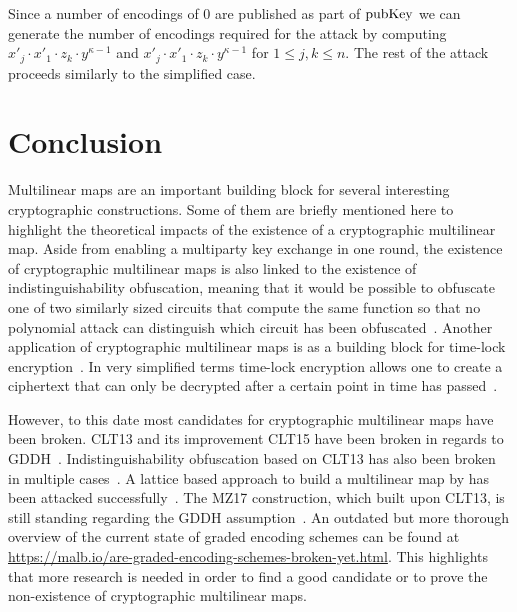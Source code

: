 \documentclass[english]{scrartcl}
\theoremstyle{plain}
\theoremstyle{definition}
\begin{document}
    Since a number of encodings of 0 are published as part of $\mathrm{pubKey}$ we can generate the number of encodings required for the attack by computing $x'_j \cdot x'_1 \cdot z_k \cdot y^{\kappa - 1}$ and $x'_j \cdot x'_1 \cdot z_k \cdot y^{\kappa - 1}$ for $1 \leq j, k \leq n$.
    The rest of the attack proceeds similarly to the simplified case.

    \section{Conclusion}
    Multilinear maps are an important building block for several interesting cryptographic constructions. Some of them are briefly mentioned here to highlight the theoretical impacts of the existence of a cryptographic multilinear map.
    Aside from enabling a multiparty key exchange in one round, the existence of cryptographic multilinear maps is also linked to the existence of indistinguishability obfuscation, meaning that it would be possible to obfuscate one of two similarly sized circuits that compute the same function so that no polynomial attack can distinguish which circuit has been obfuscated~\cite{albrecht2020multilinear}.
    Another application of cryptographic multilinear maps is as a building block for time-lock encryption~\cite{liu2018build}. In very simplified terms time-lock encryption allows one to create a ciphertext that can only be decrypted after a certain point in time has passed~\cite{liu2018build}.

    However, to this date most candidates for cryptographic multilinear maps have been broken. CLT13 and its improvement CLT15 have been broken in regards to GDDH~\cite{cryptoeprint:2014:906,cryptoeprint:2016:135}. Indistinguishability obfuscation based on CLT13 has also been broken in multiple cases~\cite{cryptoeprint:2019:1254,cryptoeprint:2019:309}.
    A lattice based approach to build a multilinear map by \citeauthor*{cryptoeprint:mm_gentry} has been attacked successfully~\cite*{cryptoeprint:ggh_attack}.
    The MZ17 construction, which built upon CLT13, is still standing regarding the GDDH assumption~\cite{cryptoeprint:2017:946}.
    An outdated but more thorough overview of the current state of graded encoding schemes can be found at \url{https://malb.io/are-graded-encoding-schemes-broken-yet.html}. This highlights that more research is needed in order to find a good candidate or to prove the non-existence of cryptographic multilinear maps.

    \printbibliography
\end{document}
